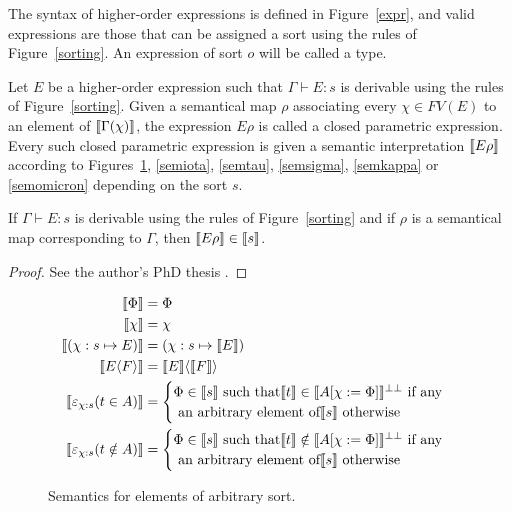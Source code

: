\begin{definition}
  The syntax of higher-order expressions is defined in Figure~\ref{expr},
  and valid expressions are those that can be assigned a sort using the
  rules of Figure~\ref{sorting}. An expression of sort $o$ will be called
  a type.
\end{definition}

\begin{definition}
  Let $E$ be a higher-order expression such that $\Gamma \vdash E : s$ is
  derivable using the rules of Figure~\ref{sorting}. Given a semantical
  map $\rho$ associating every $\chi \in FV(E)$ to an element of
  $\llbracket \Gamma(\chi) \rrbracket$, the expression $E\rho$ is called
  a closed parametric expression. Every such closed parametric expression is
  given a semantic interpretation $\llbracket E\rho \rrbracket$ according to
  Figures~\ref{semany}, \ref{semiota}, \ref{semtau}, \ref{semsigma},
  \ref{semkappa} or \ref{semomicron} depending on the sort $s$.
\end{definition}

\begin{lemma}
  If $\Gamma \vdash E : s$ is derivable using the rules of
  Figure~\ref{sorting} and if $\rho$ is a semantical map corresponding to
  $\Gamma$, then $\llbracket E\rho \rrbracket \in \llbracket s \rrbracket$.
\end{lemma}
\begin{proof}
  See the author's PhD thesis \cite[Chapter~4]{lepigrePhD}.
\end{proof}

\begin{figure}
  \begin{align*}
    \llbracket \Phi \rrbracket &= \Phi\\
    \llbracket \chi \rrbracket &= \chi\\
    \llbracket (\chi:s \mapsto E) \rrbracket
      &= (\chi:s \mapsto \llbracket E \rrbracket)\\
    \llbracket E\langle F \rangle \rrbracket
      &= \llbracket E \rrbracket \langle \llbracket F \rrbracket \rangle\\
    \llbracket \varepsilon_{\chi:s}(t \in A) \rrbracket
      &= \begin{cases}
           \Phi \in \llbracket s \rrbracket \text{ such that}
             \llbracket t \rrbracket \in \llbracket A[\chi := \Phi]
             \rrbracket^{\bot\bot} \text{ if any}\\
           \text{ an arbitrary element of} \llbracket s \rrbracket
             \text { otherwise}
         \end{cases}\\
    \llbracket \varepsilon_{\chi:s}(t \notin A) \rrbracket
      &= \begin{cases}
           \Phi \in \llbracket s \rrbracket \text{ such that}
             \llbracket t \rrbracket \notin \llbracket A[\chi := \Phi]
             \rrbracket^{\bot\bot} \text{ if any}\\
           \text{ an arbitrary element of} \llbracket s \rrbracket
             \text { otherwise}
         \end{cases}
  \end{align*}
  \caption{Semantics for elements of arbitrary sort.}\label{semany}
\end{figure}

